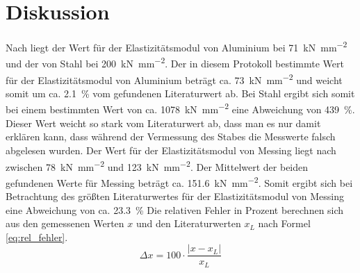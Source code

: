 \section{Diskussion}

Nach \textcite{demtroeder:exp1} liegt der Wert für der Elastizitätsmodul
von Aluminium bei \SI{71}{\kilo\newton\per\milli\metre^2} und der von
Stahl bei \SI{200}{\kilo\newton\per\milli\metre^2}.  Der in diesem
Protokoll bestimmte Wert für der Elastizitätsmodul von Aluminium beträgt
ca. \SI{73}{\kilo\newton\per\milli\metre^2} und weicht somit um
ca. \SI{2.1}{\percent} vom gefundenen Literaturwert ab.  Bei Stahl
ergibt sich somit bei einem bestimmten Wert von
ca. \SI{1078}{\kilo\newton\per\milli\metre^2} eine Abweichung von
\SI{439}{\percent}. Dieser Wert weicht so stark vom Literaturwert ab,
dass man es nur damit erklären kann, dass während der Vermessung des
Stabes die Messwerte falsch abgelesen wurden.  Der Wert für der
Elastizitätsmodul von Messing liegt nach \textcite{peter-brehm} zwischen
\SI{78}{\kilo\newton\per\milli\metre^2} und
\SI{123}{\kilo\newton\per\milli\metre^2}. Der Mittelwert der beiden
gefundenen Werte für Messing beträgt
ca. \SI{151,6}{\kilo\newton\per\milli\metre^2}. Somit ergibt sich bei
Betrachtung des größten Literaturwertes für der Elastizitätsmodul von
Messing eine Abweichung von ca. \SI{23.3}{\percent} Die relativen Fehler
in Prozent berechnen sich aus den gemessenen Werten $x$ und den
Literaturwerten $x_L$ nach Formel \eqref{eq:rel_fehler}.
%
\begin{equation}
\label{eq:rel_fehler}
\Delta x = 100 \cdot \frac{|x - x_L|}{x_L}    
\end{equation}
